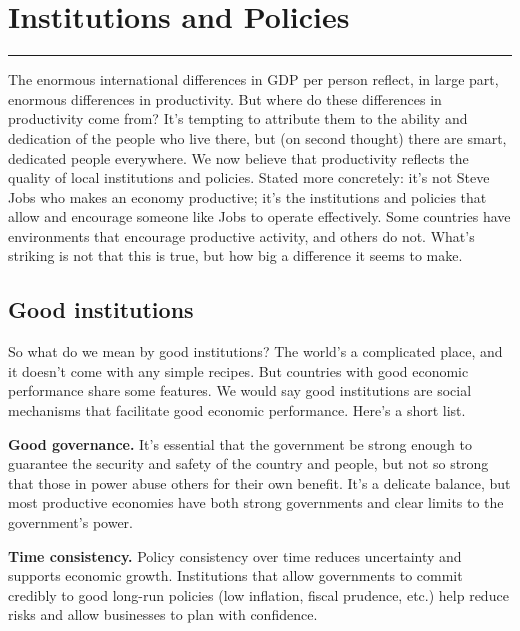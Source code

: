 \chapter{Institutions and Policies}\label{chp:insp}
\hypertarget{institutions}{}


\rule{\textwidth}{1pt}

The enormous international differences in GDP per person
reflect, in large part, enormous differences in
productivity.
But where do these differences in productivity come from?
It's tempting to attribute them to the ability and dedication
of the people who live there,
but (on second thought) there are smart, dedicated people everywhere.
We now believe that productivity reflects
the quality of local institutions and policies.
Stated more concretely:
it's not Steve Jobs who makes an economy productive;
it's the institutions and policies that allow and encourage someone like Jobs to
operate effectively.
Some countries have environments that encourage productive
activity, and others do not.
What's striking is not that this is true,
but how big a difference it seems to make.


\section{Good institutions}

So what do we mean by good institutions? 
The world's a complicated place, and it doesn't come
with any simple recipes.
But countries with good economic performance
 share some features.
We would say good institutions are social mechanisms
that facilitate good economic performance. Here's a short list.

\textbf{Good governance. }
It's essential that the government be strong enough
to guarantee the security and safety of the country
and people,
but not so strong that those in power abuse others for their own benefit.
It's a delicate balance,
but most productive economies have both strong governments
and clear limits to the government's power.

\textbf{Time consistency.}
\label{sec:time_cons}Policy consistency over time reduces uncertainty and supports economic
growth. Institutions that allow governments to commit credibly to
good long-run policies (low inflation, fiscal prudence, etc.) help
reduce risks and allow businesses to plan with confidence.

